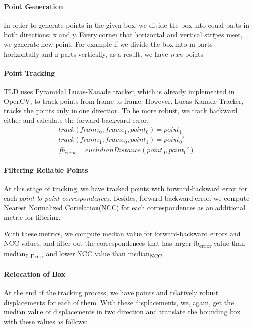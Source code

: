 \documentclass{report}
\begin{document}
        \paragraph{Point Generation}
            In order to generate points in the given box, we divide the box into equal
            parts in both directions: x and y. Every corner that horizontal and vertical stripes meet, we generate
            new point. For example if we divide the box into m parts horizontally and n parts vertically, as a result,
            we have \textit{mxn} points
        \paragraph{Point Tracking}
            TLD uses Pyramidal Lucas-Kanade tracker, which is already implemented in OpenCV, to track points from frame
            to frame. However, Lucas-Kanade Tracker, tracks the points only in one direction. To be more robust,
            we track backward either and calculate the forward-backward error.
            \begin{gather}
                track(frame_{0}, frame_{1}, point_{0}) = point_{1} \\
                track(frame_{1}, frame_{0}, point_{1}) = point_{0}' \\
                fb_{error} = euclidianDistance(point_{0}, point_{0}')
            \end{gather}
        \paragraph{Filtering Reliable Points}
            At this stage of tracking, we have tracked points with forward-backward error
            for each \textit{point to point correspondences}. Besides, forward-backward error, we compute
            Nearest Normalized Correlation(NCC) for each correspondences as an additional metric for filtering.

            With these metrics, we compute median value for forward-backward errors and NCC values, and filter out
            the correspondences that has larger fb\textsubscript{error} value than median\textsubscript{fbError} and
            lower NCC value than median\textsubscript{NCC}.

        \paragraph{Relocation of Box}
            At the end of the tracking process, we have points and relatively robust displacements for each of them.
            With these displacements, we, again, get the median value of displacements in two direction and translate
            the bounding box with these values as follows:
\end{document}
